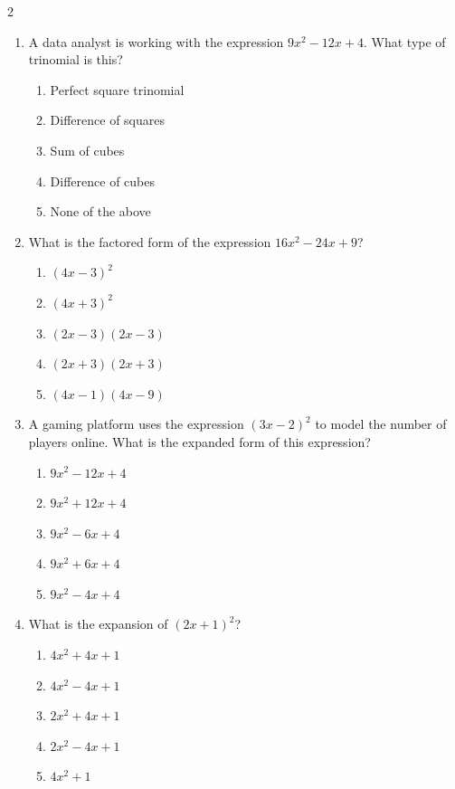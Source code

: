 \documentclass[10pt]{article}
\begin{document}
\begin{multicols}{2}
\begin{enumerate}[label=\textbf{Q\arabic*.}, leftmargin=*, itemsep=6pt, parsep=0pt]
  \item \small A data analyst is working with the expression $9x^2 - 12x + 4$. What type of trinomial is this?
  \begin{enumerate}[label=(\Alph*), leftmargin=0.6cm, nosep, itemsep=2pt]
    \item Perfect square trinomial
    \item Difference of squares
    \item Sum of cubes
    \item Difference of cubes
    \item None of the above
  \end{enumerate}

  \item \small What is the factored form of the expression $16x^2 - 24x + 9$?
  \begin{enumerate}[label=(\Alph*), leftmargin=0.6cm, nosep, itemsep=2pt]
    \item $(4x - 3)^2$
    \item $(4x + 3)^2$
    \item $(2x - 3)(2x - 3)$
    \item $(2x + 3)(2x + 3)$
    \item $(4x - 1)(4x - 9)$
  \end{enumerate}

  \item \small A gaming platform uses the expression $(3x - 2)^2$ to model the number of players online. What is the expanded form of this expression?
  \begin{enumerate}[label=(\Alph*), leftmargin=0.6cm, nosep, itemsep=2pt]
    \item $9x^2 - 12x + 4$
    \item $9x^2 + 12x + 4$
    \item $9x^2 - 6x + 4$
    \item $9x^2 + 6x + 4$
    \item $9x^2 - 4x + 4$
  \end{enumerate}

  \item \small What is the expansion of $(2x + 1)^2$?
  \begin{enumerate}[label=(\Alph*), leftmargin=0.6cm, nosep, itemsep=2pt]
    \item $4x^2 + 4x + 1$
    \item $4x^2 - 4x + 1$
    \item $2x^2 + 4x + 1$
    \item $2x^2 - 4x + 1$
    \item $4x^2 + 1$
  \end{enumerate}


\end{enumerate}
\end{multicols}
\end{document}
